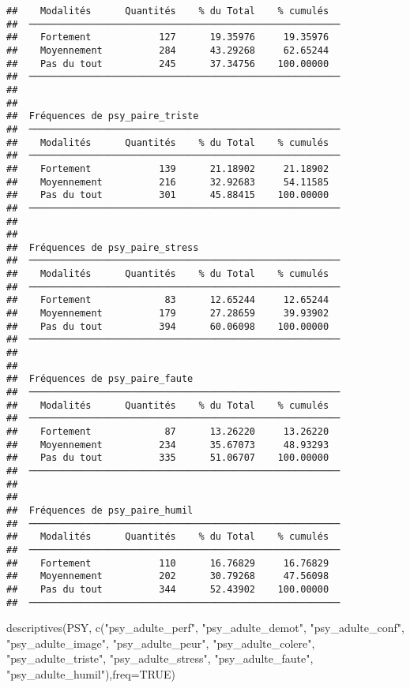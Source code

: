\documentclass[
]{article}
\newenvironment{Shaded}{\begin{snugshade}}{\end{snugshade}}
\newcommand{\AttributeTok}[1]{\textcolor[rgb]{0.77,0.63,0.00}{#1}}
\newcommand{\ConstantTok}[1]{\textcolor[rgb]{0.00,0.00,0.00}{#1}}
\newcommand{\FunctionTok}[1]{\textcolor[rgb]{0.00,0.00,0.00}{#1}}
\newcommand{\NormalTok}[1]{#1}
\newcommand{\StringTok}[1]{\textcolor[rgb]{0.31,0.60,0.02}{#1}}
\begin{document}
\begin{verbatim}
##    Modalités      Quantités    % du Total    % cumulés   
##  ─────────────────────────────────────────────────────── 
##    Fortement            127      19.35976     19.35976   
##    Moyennement          284      43.29268     62.65244   
##    Pas du tout          245      37.34756    100.00000   
##  ─────────────────────────────────────────────────────── 
## 
## 
##  Fréquences de psy_paire_triste                          
##  ─────────────────────────────────────────────────────── 
##    Modalités      Quantités    % du Total    % cumulés   
##  ─────────────────────────────────────────────────────── 
##    Fortement            139      21.18902     21.18902   
##    Moyennement          216      32.92683     54.11585   
##    Pas du tout          301      45.88415    100.00000   
##  ─────────────────────────────────────────────────────── 
## 
## 
##  Fréquences de psy_paire_stress                          
##  ─────────────────────────────────────────────────────── 
##    Modalités      Quantités    % du Total    % cumulés   
##  ─────────────────────────────────────────────────────── 
##    Fortement             83      12.65244     12.65244   
##    Moyennement          179      27.28659     39.93902   
##    Pas du tout          394      60.06098    100.00000   
##  ─────────────────────────────────────────────────────── 
## 
## 
##  Fréquences de psy_paire_faute                           
##  ─────────────────────────────────────────────────────── 
##    Modalités      Quantités    % du Total    % cumulés   
##  ─────────────────────────────────────────────────────── 
##    Fortement             87      13.26220     13.26220   
##    Moyennement          234      35.67073     48.93293   
##    Pas du tout          335      51.06707    100.00000   
##  ─────────────────────────────────────────────────────── 
## 
## 
##  Fréquences de psy_paire_humil                           
##  ─────────────────────────────────────────────────────── 
##    Modalités      Quantités    % du Total    % cumulés   
##  ─────────────────────────────────────────────────────── 
##    Fortement            110      16.76829     16.76829   
##    Moyennement          202      30.79268     47.56098   
##    Pas du tout          344      52.43902    100.00000   
##  ───────────────────────────────────────────────────────
\end{verbatim}

\begin{Shaded}
\begin{Highlighting}[]
\FunctionTok{descriptives}\NormalTok{(PSY, }\FunctionTok{c}\NormalTok{(}\StringTok{"psy\_adulte\_perf"}\NormalTok{, }\StringTok{"psy\_adulte\_demot"}\NormalTok{, }\StringTok{"psy\_adulte\_conf"}\NormalTok{, }\StringTok{"psy\_adulte\_image"}\NormalTok{, }\StringTok{"psy\_adulte\_peur"}\NormalTok{, }\StringTok{"psy\_adulte\_colere"}\NormalTok{, }\StringTok{"psy\_adulte\_triste"}\NormalTok{, }\StringTok{"psy\_adulte\_stress"}\NormalTok{, }\StringTok{"psy\_adulte\_faute"}\NormalTok{, }\StringTok{"psy\_adulte\_humil"}\NormalTok{),}\AttributeTok{freq=}\ConstantTok{TRUE}\NormalTok{)}
\end{Highlighting}
\end{Shaded}
\end{document}
